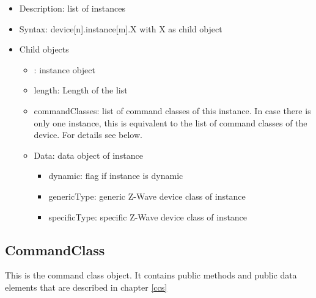 \begin {itemize}
\item Description: list of instances
\item Syntax:  device[n].instance[m].X with  X as child object
\item Child objects
\begin {itemize}
\item [m]: instance object
\item length: Length of the list
\item commandClasses: list of command classes of this instance. In case there is only one instance, this is equivalent to the list of command classes of the device. For details see below.
\item Data: data object of instance 
\begin {itemize}
\item dynamic: flag if instance is dynamic
\item genericType: generic Z-Wave device class of instance
\item specificType: specific Z-Wave device class of instance
\end {itemize}
\end {itemize}
\end {itemize}

\subsection{CommandClass}

This is the command class object. It contains public methods and public data elements that are described
in chapter \ref{ccs}

